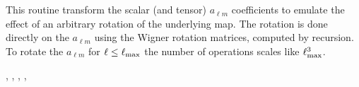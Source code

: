 
\sloppy


 \section[rotate\_alm*]{ }
\label{sub:rotate_alm}
\author{Eric Hivon}

\begin{facility}
{This routine transform the scalar (and tensor) $a_{\ell m}$ coefficients to
emulate the effect of an arbitrary rotation of the underlying map. The rotation is done
directly on the $a_{\ell m}$ using the Wigner rotation matrices, computed by
recursion.
To rotate the $a_{\ell m}$ for $\ell \leq \ell_{\mathrm{max}}$ the number of
operations scales like $\ell_{\mathrm{max}}^3$.}
{\modAlmTools}
\end{facility}

\begin{f90format}
{%
, %
, %
, %
, %
}
\end{f90format}

